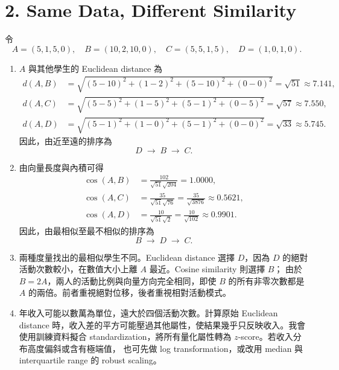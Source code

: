 \section*{2. Same Data, Different Similarity}

令
\[
 A=(5,1,5,0),\quad B=(10,2,10,0),\quad
 C=(5,5,1,5),\quad D=(1,0,1,0).
\]

\begin{enumerate}
  \item $A$ 與其他學生的 Euclidean distance 為
  \begin{align*}
    d(A,B)&=\sqrt{(5-10)^2+(1-2)^2+(5-10)^2+(0-0)^2}
           =\sqrt{51}\approx 7.141,\\
    d(A,C)&=\sqrt{(5-5)^2+(1-5)^2+(5-1)^2+(0-5)^2}
           =\sqrt{57}\approx 7.550,\\
    d(A,D)&=\sqrt{(5-1)^2+(1-0)^2+(5-1)^2+(0-0)^2}
           =\sqrt{33}\approx 5.745.
  \end{align*}
  因此，由近至遠的排序為
  \[
    \boxed{D\;\rightarrow\;B\;\rightarrow\;C}.
  \]

  \item 由向量長度與內積可得
  \begin{align*}
    \cos(A,B)&=\frac{102}{\sqrt{51}\sqrt{204}}=1.0000,\\
    \cos(A,C)&=\frac{35}{\sqrt{51}\sqrt{76}}
              =\frac{35}{\sqrt{3876}}\approx 0.5621,\\
    \cos(A,D)&=\frac{10}{\sqrt{51}\sqrt{2}}
              =\frac{10}{\sqrt{102}}\approx 0.9901.
  \end{align*}
  因此，由最相似至最不相似的排序為
  \[
    \boxed{B\;\rightarrow\;D\;\rightarrow\;C}.
  \]

  \item 兩種度量找出的最相似學生不同。Euclidean distance 選擇 $D$，因為 $D$
  的絕對活動次數較小，在數值大小上離 $A$ 最近。Cosine similarity 則選擇 $B$；
  由於 $B=2A$，兩人的活動比例與向量方向完全相同，即使 $B$ 的所有非零次數都是
  $A$ 的兩倍。前者重視絕對位移，後者重視相對活動模式。

  \item 年收入可能以數萬為單位，遠大於四個活動次數。計算原始 Euclidean distance
  時，收入差的平方可能壓過其他屬性，使結果幾乎只反映收入。我會使用訓練資料擬合
  standardization，將所有量化屬性轉為 $z$-score。若收入分布高度偏斜或含有極端值，
  也可先做 log transformation，或改用 median 與 interquartile range 的 robust scaling。
\end{enumerate}

\clearpage
